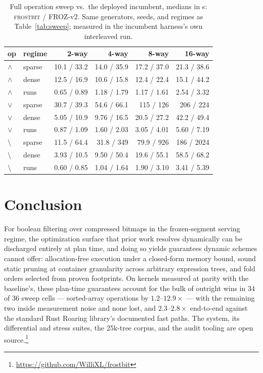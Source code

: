 \documentclass[sigconf,nonacm]{acmart}
\newcommand{\fb}{\textsc{frostbit}}
\begin{document}
\begin{table}[t]
\caption{Full operation sweep vs.\ the deployed incumbent, medians in
\textmu s: \fb{} / FROZ-v2. Same generators, seeds, and regimes as
Table~\ref{tab:sweep}; measured in the incumbent harness's own
interleaved run.}
\label{tab:incumbentsweep}
\small
\begin{tabular}{llrrrr}
\toprule
op & regime & 2-way & 4-way & 8-way & 16-way \\
\midrule
$\wedge$ & sparse & 10.1 / 33.2 & 14.0 / 35.9 & 17.2 / 37.0 & 21.3 / 38.6 \\
$\wedge$ & dense & 12.5 / 16.9 & 10.6 / 15.8 & 12.4 / 22.4 & 15.1 / 44.2 \\
$\wedge$ & runs & 0.65 / 0.89 & 1.18 / 1.79 & 1.17 / 1.61 & 2.54 / 3.32 \\
$\vee$ & sparse & 30.7 / 39.3 & 54.6 / 66.1 & 115 / 126 & 206 / 224 \\
$\vee$ & dense & 5.05 / 10.9 & 9.76 / 16.5 & 20.5 / 27.2 & 42.2 / 49.4 \\
$\vee$ & runs & 0.87 / 1.09 & 1.60 / 2.03 & 3.05 / 4.01 & 5.60 / 7.19 \\
$\setminus$ & sparse & 11.5 / 64.4 & 31.8 / 349 & 79.9 / 926 & 186 / 2024 \\
$\setminus$ & dense & 3.93 / 10.5 & 9.50 / 50.4 & 19.6 / 55.1 & 58.5 / 68.2 \\
$\setminus$ & runs & 0.60 / 0.85 & 1.04 / 1.64 & 1.90 / 3.10 & 3.41 / 5.39 \\
\bottomrule
\end{tabular}
\end{table}

\section{Conclusion}

For boolean filtering over compressed bitmaps in the frozen-segment
serving regime, the optimization surface that prior work resolves
dynamically can be discharged entirely at plan time, and doing so yields
guarantees dynamic schemes cannot offer: allocation-free execution under
a closed-form memory bound, sound static pruning at container
granularity across arbitrary expression trees, and fold orders selected
from proven footprints. On kernels measured at parity with the
baseline's, these plan-time guarantees account for the bulk of
outright wins in 34 of 36 sweep cells --- sorted-array operations by
$1.2$--$12.9\times$ --- with the remaining two inside measurement
noise and none lost, and $2.3$--$2.8\times$ end-to-end against the
standard Rust Roaring library's documented fast paths.
The system, its differential
and stress suites, the 25k-tree corpus, and the audit tooling are open
source.\footnote{\url{https://github.com/WilliXL/frostbit}}
\end{document}
